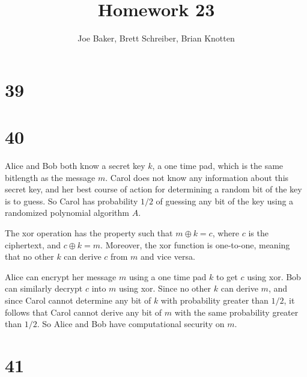 \documentclass[letterpaper,notitlepage,twoside]{article}
\begin{document}
\title{Homework 23}
\author{Joe Baker, Brett Schreiber, Brian Knotten}
\maketitle

\section*{39}

\section*{40}
Alice and Bob both know a secret key $k$, a one time pad, which is the same bitlength as the message $m$.
Carol does not know any information about this secret key, and her best course of action for determining a random bit of the key is to guess.
So Carol has probability $1/2$ of guessing any bit of the key using a randomized polynomial algorithm $A$.

The xor operation has the property such that $m \oplus k = c$, where $c$ is the ciphertext, and $c \oplus k = m$. Moreover, the xor function is one-to-one, meaning that no other $k$ can derive $c$ from $m$ and vice versa.

Alice can encrypt her message $m$ using a one time pad $k$ to get $c$ using xor. Bob can similarly decrypt $c$ into $m$ using xor.
Since no other $k$ can derive $m$, and since Carol cannot determine any bit of $k$ with probability greater than $1/2$, it follows that Carol cannot derive any bit of $m$ with the same probability greater than $1/2$.
So Alice and Bob have computational security on $m$.

\section*{41}
\end{document}
